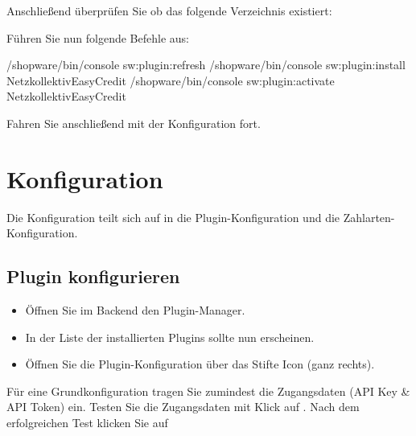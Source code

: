 \documentclass[a4paper,10pt,openany,oneside,ngerman]{sphinxmanual}
\begin{document}
Anschließend überprüfen Sie ob das folgende Verzeichnis existiert:
\begin{quote}

\end{quote}

Führen Sie nun folgende Befehle aus:

%
\begin{sphinxVerbatim}[commandchars=\\\{\}]
/shopware/bin/console sw:plugin:refresh
/shopware/bin/console sw:plugin:install NetzkollektivEasyCredit
/shopware/bin/console sw:plugin:activate NetzkollektivEasyCredit
\end{sphinxVerbatim}

Fahren Sie anschließend mit der Konfiguration fort.


\chapter{Konfiguration}
\label{\detokenize{configuration:konfiguration}}\label{\detokenize{configuration::doc}}
Die Konfiguration teilt sich auf in die Plugin-Konfiguration und die Zahlarten-Konfiguration.


\section{Plugin konfigurieren}
\label{\detokenize{configuration:plugin-konfigurieren}}
\noindent{}
\begin{itemize}
\item {} 
Öffnen Sie im Backend den Plugin-Manager. 

\item {} 
In der Liste der installierten Plugins sollte nun  erscheinen.

\item {} 
Öffnen Sie die Plugin-Konfiguration über das Stifte Icon (ganz rechts).

\end{itemize}

Für eine Grundkonfiguration tragen Sie zumindest die Zugangsdaten (API Key \& API Token) ein.
Testen Sie die Zugangsdaten mit Klick auf .
Nach dem erfolgreichen Test klicken Sie auf 
\end{document}
